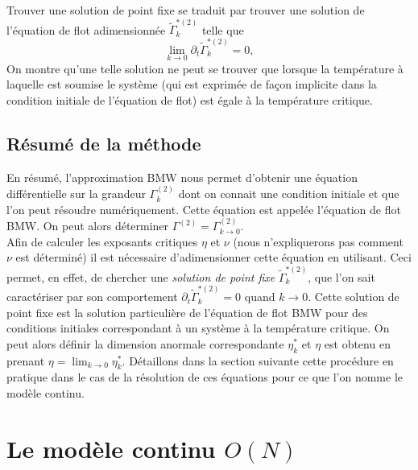\documentclass[10.5pt]{article}
\begin{document}
\begin{multicols*}{2}
Trouver une solution de point fixe se traduit par trouver une solution de l'équation de flot adimensionnée $\tilde{\Gamma}^{*(2)}_k$ telle que
\begin{equation}
\lim\limits_{k \to 0} \partial_t \tilde{\Gamma}^{*(2)}_k = 0,
\end{equation}
On montre qu'une telle solution ne peut se trouver que lorsque 
la température à laquelle est soumise le système (qui est exprimée de façon implicite dans la condition initiale de l'équation de flot) est égale à la température critique.  \\






\vspace*{11pt}
\subsection{Résumé de la méthode}

En résumé, l'approximation BMW nous permet d'obtenir une équation différentielle sur la grandeur $\Gamma^{(2)}_k$ dont on connait une condition initiale et que l'on peut résoudre numériquement. Cette équation est appelée l'équation de flot BMW. On peut alors déterminer $\Gamma^{(2)} = \Gamma^{(2)}_{k\to 0}$. \\

Afin de calculer les exposants critiques $\eta$ et $\nu$ (nous n'expliquerons pas comment $\nu$ est déterminé) il est nécessaire d'adimensionner cette équation en utilisant. Ceci permet, en effet, de chercher une \textit{solution de point fixe} $\tilde{\Gamma}^{* (2)}_k$, que l'on sait caractériser par son comportement $\partial_t \tilde{\Gamma}^{* (2)}_k = 0$ quand $k \to 0$. Cette solution de point fixe est la solution particulière de l'équation de flot BMW pour des conditions initiales correspondant à un système à la température critique. On peut alors définir la dimension anormale correspondante $\eta_k^*$ et $\eta$ est obtenu en prenant $\eta = \lim_{k\to 0} \eta_k^*$.  Détaillons dans la section suivante cette procédure en pratique dans le cas de la résolution de ces équations pour ce que l'on nomme le modèle continu. 

\newpage


 
\section{Le modèle continu $O(N)$}


\end{multicols*}
\end{document}
